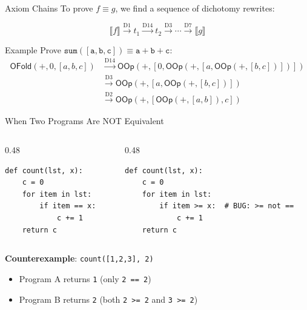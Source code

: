 \documentclass[aspectratio=169,11pt]{beamer}
\newcommand{\den}[1]{\llbracket #1 \rrbracket}
\begin{document}
\begin{frame}{Axiom Chains}
To prove $f \equiv g$, we find a sequence of dichotomy rewrites:

\[
  \den{f} \xrightarrow{\text{D1}} t_1 \xrightarrow{\text{D14}} t_2
  \xrightarrow{\text{D3}} \cdots \xrightarrow{\text{D7}} \den{g}
\]

\vspace{0.5em}
\begin{block}{Example}
Prove $\mathtt{sum([a,b,c])} \equiv \mathtt{a + b + c}$:
\begin{align*}
  \mathsf{OFold}(+, 0, [a,b,c])
  &\xrightarrow{\text{D14}} \mathsf{OOp}(+, [0, \mathsf{OOp}(+, [a, \mathsf{OOp}(+, [b,c])])])
  \\
  &\xrightarrow{\text{D3}} \mathsf{OOp}(+, [a, \mathsf{OOp}(+, [b,c])])
  \\
  &\xrightarrow{\text{D2}} \mathsf{OOp}(+, [\mathsf{OOp}(+, [a,b]), c])
\end{align*}
\end{block}
\end{frame}

\begin{frame}[fragile]{When Two Programs Are NOT Equivalent}
\begin{columns}
\begin{column}{0.48\textwidth}
\begin{lstlisting}[language=deppy,title={\textbf{Program A}}]
def count(lst, x):
    c = 0
    for item in lst:
        if item == x:
            c += 1
    return c
\end{lstlisting}
\end{column}
\begin{column}{0.48\textwidth}
\begin{lstlisting}[language=deppy,title={\textbf{Program B (buggy)}}]
def count(lst, x):
    c = 0
    for item in lst:
        if item >= x:  # BUG: >= not ==
            c += 1
    return c
\end{lstlisting}
\end{column}
\end{columns}

\vspace{0.5em}
\textbf{Counterexample}: \texttt{count([1,2,3], 2)}
\begin{itemize}
\item Program A returns \texttt{1} (only \texttt{2 == 2})
\item Program B returns \texttt{2} (both \texttt{2 >= 2} and \texttt{3 >= 2})
\end{itemize}
\end{frame}
\end{document}
